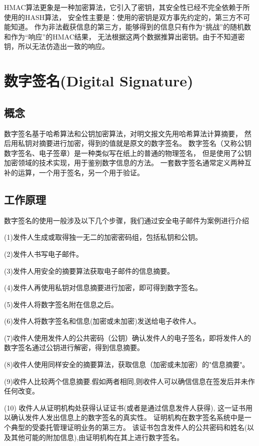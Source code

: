 \documentclass{book}
\begin{document}
HMAC算法更象是一种加密算法，它引入了密钥，其安全性已经不完全依赖于所使用的HASH算法，
安全性主要是：使用的密钥是双方事先约定的，第三方不可能知道。
作为非法截获信息的第三方，能够得到的信息只有作为“挑战”的随机数和作为“响应”的HMAC结果，
无法根据这两个数据推算出密钥。由于不知道密钥，所以无法仿造出一致的响应。

\section{数字签名(Digital Signature)}

\subsection{概念}

数字签名基于哈希算法和公钥加密算法，对明文报文先用哈希算法计算摘要，
然后用私钥对摘要进行加密，得到的值就是原文的数字签名。
数字签名（又称公钥数字签名、电子签章）是一种类似写在纸上的普通的物理签名，
但是使用了公钥加密领域的技术实现，用于鉴别数字信息的方法。
一套数字签名通常定义两种互补的运算，一个用于签名，另一个用于验证。

\subsection{工作原理}

数字签名的使用一般涉及以下几个步骤，我们通过安全电子邮件为案例进行介绍

(1)发件人生成或取得独一无二的加密密码组，包括私钥和公钥。

(2)发件人书写电子邮件。

(3)发件人用安全的摘要算法获取电子邮件的信息摘要。

(4)发件人再使用私钥对信息摘要进行加密，即可得到数字签名。　　

(5)发件人将数字签名附在信息之后。

(6)发件人将数字签名和信息(加密或未加密)发送给电子收件人。

(7)收件人使用发件人的公共密码（公钥）确认发件人的电子签名，即将发件人的数字签名通过公钥进行解密，得到信息摘要。

(8)收件人使用同样安全的摘要算法，获取信息（加密或未加密）的"信息摘要"。

(9)收件人比较两个信息摘要.假如两者相同,则收件人可以确信信息在签发后并未作任何改变。

(10) 收件人从证明机构处获得认证证书(或者是通过信息发件人获得),
这一证书用以确认发件人发出信息上的数字签名的真实性。
证明机构在数字签名系统中是一个典型的受委托管理证明业务的第三方。
该证书包含发件人的公共密码和姓名(以及其他可能的附加信息),由证明机构在其上进行数字签名。
\end{document}
